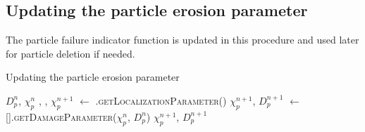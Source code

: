 \subsection{Updating the particle erosion parameter}
The particle failure indicator function is updated in this procedure and used later for 
particle deletion if needed.
\begin{breakablealgorithm}
  \caption{Updating the particle erosion parameter}
  \begin{algorithmic}[1]
    \Require $D_p^n$, $\chi^n_p$
             , , 
            \State $\chi^{n+1}_p$ $\leftarrow$
               .\textsc{getLocalizationParameter}()
          \Else
            \State $\chi^{n+1}_p$, $D_p^{n+1}$ $\leftarrow$
               [\TTmatl].\textsc{getDamageParameter}($\chi^n_p$, $D^n_p$)
             \WWRP {}
          \EndIf
        \EndFor
      \EndFor
      \State \Return $\chi^{n+1}_p$, $D_p^{n+1}$
    \EndProcedure
  \end{algorithmic}
\end{breakablealgorithm}


